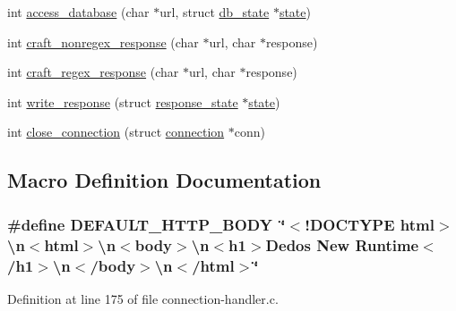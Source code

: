 \begin{DoxyCompactItemize}
\item 
int \hyperlink{connection-handler_8c_a371095605bf8a8222590bc46b2d38b59}{access\-\_\-database} (char $\ast$url, struct \hyperlink{structdb__state}{db\-\_\-state} $\ast$\hyperlink{http__parser_8c_adc6e5733fc3c22f0a7b2914188c49c90}{state})
\item 
int \hyperlink{connection-handler_8c_a40ddee505082e691c9e94a8afda7d4b5}{craft\-\_\-nonregex\-\_\-response} (char $\ast$url, char $\ast$response)
\item 
int \hyperlink{connection-handler_8c_a7cb78a1a29fdde2658e016d01287bf7a}{craft\-\_\-regex\-\_\-response} (char $\ast$url, char $\ast$response)
\item 
int \hyperlink{connection-handler_8c_ad3d7de1563a29af15a1bbef2fc7674c9}{write\-\_\-response} (struct \hyperlink{structresponse__state}{response\-\_\-state} $\ast$\hyperlink{http__parser_8c_adc6e5733fc3c22f0a7b2914188c49c90}{state})
\item 
int \hyperlink{connection-handler_8c_a0171242e91a6a1c18938b8aba84625e5}{close\-\_\-connection} (struct \hyperlink{structconnection}{connection} $\ast$conn)
\end{DoxyCompactItemize}


\subsection{Macro Definition Documentation}
\hypertarget{connection-handler_8c_a2870bb55c6ebf7807375ec589e6a1919}{
\subsubsection[{D\-E\-F\-A\-U\-L\-T\-\_\-\-H\-T\-T\-P\-\_\-\-B\-O\-D\-Y}]{\setlength{\rightskip}{0pt plus 5cm}\#define D\-E\-F\-A\-U\-L\-T\-\_\-\-H\-T\-T\-P\-\_\-\-B\-O\-D\-Y~\char`\"{}$<$!D\-O\-C\-T\-Y\-P\-E html$>$\textbackslash{}n$<$html$>$\textbackslash{}n$<$body$>$\textbackslash{}n$<$h1$>$Dedos New Runtime$<$/h1$>$\textbackslash{}n$<$/body$>$\textbackslash{}n$<$/html$>$\char`\"{}}}\label{connection-handler_8c_a2870bb55c6ebf7807375ec589e6a1919}


Definition at line 175 of file connection-\/handler.\-c.

